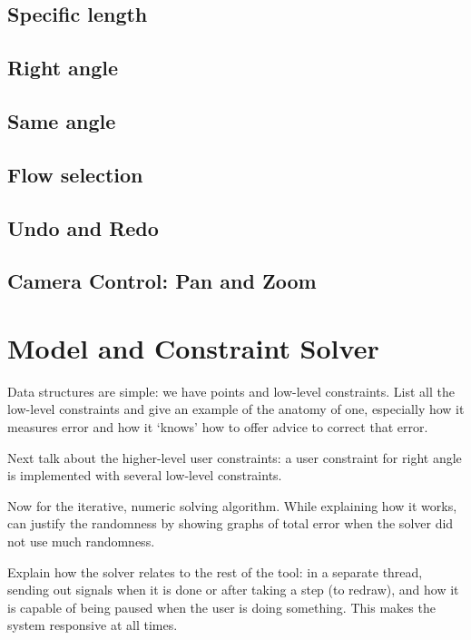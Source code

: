 \subsection{Specific length}

\subsection{Right angle}

\subsection{Same angle}

\subsection{Flow selection}

\subsection{Undo and Redo}

\subsection{Camera Control: Pan and Zoom}

\section{Model and Constraint Solver}

Data structures are simple: we have points and low-level
constraints. List all the low-level constraints and give an example of
the anatomy of one, especially how it measures error and how it
`knows' how to offer advice to correct that error.

Next talk about the higher-level user constraints: a user constraint
for right angle is implemented with several low-level constraints. 

Now for the iterative, numeric solving algorithm. While explaining how
it works, can justify the randomness by showing graphs of total error
when the solver did not use much randomness.

Explain how the solver relates to the rest of the tool: in a separate
thread, sending out signals when it is done or after taking a step (to
redraw), and how it is capable of being paused when the user is doing
something. This makes the system responsive at all times.

